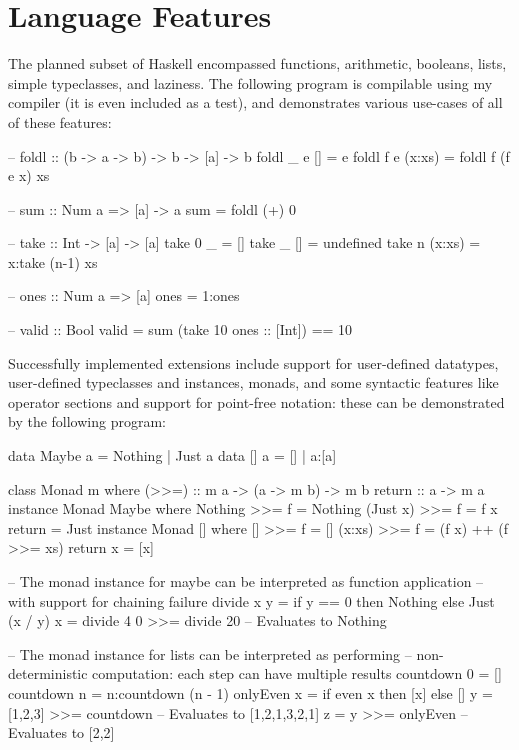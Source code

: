 \documentclass[dissertation.tex]{subfiles}
\begin{document}
\section{Language Features}
{
    The planned subset of Haskell encompassed functions, arithmetic, booleans, lists, simple typeclasses, and laziness. The following program is compilable using my compiler (it is even included as a test), and demonstrates various use-cases of all of these features:

    \begin{haskellfigure}
    -- foldl :: (b -> a -> b) -> b -> [a] -> b
    foldl _ e [] = e
    foldl f e (x:xs) = foldl f (f e x) xs

    -- sum :: Num a => [a] -> a
    sum = foldl (+) 0

    -- take :: Int -> [a] -> [a]
    take 0 _ = []
    take _ [] = undefined
    take n (x:xs) = x:take (n-1) xs

    -- ones :: Num a => [a]
    ones = 1:ones

    -- valid :: Bool
    valid = sum (take 10 ones :: [Int]) == 10
    \end{haskellfigure}


    Successfully implemented extensions include support for user-defined datatypes, user-defined typeclasses and instances, monads, and some syntactic features like operator sections and support for point-free notation: these can be demonstrated by the following program:

    \begin{haskellfigure}
    data Maybe a = Nothing | Just a
    data [] a = [] | a:[a]
    
    class Monad m where
        (>>=) :: m a -> (a -> m b) -> m b
        return :: a -> m a
    instance Monad Maybe where
        Nothing >>= f = Nothing
        (Just x) >>= f = f x
        return = Just
    instance Monad [] where
        [] >>= f = []
        (x:xs) >>= f = (f x) ++ (f >>= xs)
        return x = [x]

    -- The monad instance for maybe can be interpreted as function application
    -- with support for chaining failure
    divide x y = if y == 0 then Nothing else Just (x / y)
    x = divide 4 0 >>= divide 20 -- Evaluates to Nothing

    -- The monad instance for lists can be interpreted as performing
    -- non-deterministic computation: each step can have multiple results
    countdown 0 = []
    countdown n = n:countdown (n - 1)
    onlyEven x = if even x then [x] else []
    y = [1,2,3] >>= countdown -- Evaluates to [1,2,1,3,2,1]
    z = y >>= onlyEven -- Evaluates to [2,2]
    \end{haskellfigure}

}
\end{document}
